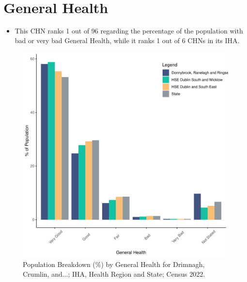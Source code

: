 \documentclass{article}
\begin{document}
\pagebreak

\section{General Health}\label{sect:GenHealth}
\begin{itemize}
\item  This CHN ranks  1 out of 96 regarding the percentage of the population with bad or very bad General Health, while it ranks   1 out of 6 CHNs in its IHA.
\end{itemize}
\begin{figure}[h]
	\centering
	\includegraphics[width = 150mm]{../figures/GenED.pdf}
	\caption{Population Breakdown (\%) by General Health for Drimnagh, Crumlin, and...; IHA, Health Region and State;  Census 2022.}
	\label{fig:2ae19629-1a6a-13a3-e055-000000000001}
	\end{figure}
\end{document}
